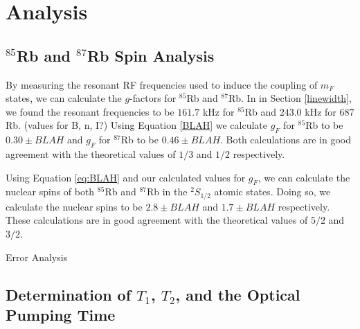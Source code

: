 
\section{Analysis}\label{analysis}

\subsection{$^{85}$Rb and $^{87}$Rb Spin Analysis}

By measuring the resonant RF frequencies used to induce the coupling of $m_F$ states, we can calculate the $g$-factors for $^{85}$Rb and $^{87}$Rb.  In in Section \ref{linewidth}, we found the resonant frequencies to be $161.7$ kHz for $^{85}$Rb and $243.0$ kHz for $6{87}$Rb.  (values for B, n, I?) Using Equation \ref{BLAH} we calculate $g_F$ for $^{85}$Rb to be $0.30\pm BLAH$ and $g_F$ for $^{87}$Rb to be $0.46\pm BLAH$.  Both calculations are in good agreement with the theoretical values of $1/3$ and $1/2$ respectively. 

Using Equation \ref{eq:BLAH} and our calculated values for $g_F$, we can calculate the nuclear spins of both $^{85}$Rb and $^{87}$Rb in the $^{2}S_{1/2}$ atomic states.  Doing so, we calculate the nuclear spins to be $2.8 \pm BLAH$ and $1.7 \pm BLAH$ respectively.  These calculations are in good agreement with the theoretical values of $5/2$ and $3/2$.

Error Analysis

\subsection{Determination of $T_{1}$, $T_{2}$, and the Optical Pumping Time}

